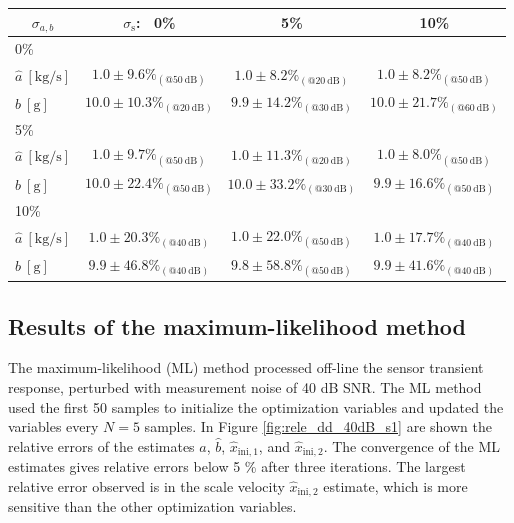 {{\begin{table}[h!]
\begin{tabular}{c| c c c} 
\hline  
$\sigma_{{a},{b}}$ & $\sigma_{\mathrm{s}}$: \ 0\% & 5\% & 10\% \\ [0.5ex] 
 \hline
 \multicolumn{1}{l|}{0\%} \\
 \multicolumn{1}{l|}{\hspace{2mm} $\widehat{a} \ \mathrm{[kg/s]}$} & $1.0 \pm 9.6 \%_{(@50 \ \mathrm{dB})}$ &  $1.0 \pm 8.2 \%_{(@20 \ \mathrm{dB})}$ & $1.0 \pm 8.2 \%_{(@50 \ \mathrm{dB})}$ \\ 
 \multicolumn{1}{l|}{\hspace{2mm} $\widehat{b} \ \mathrm{[g]}$} & $10.0 \pm 10.3 \%_{(@20 \ \mathrm{dB})}$ & $9.9 \pm 14.2 \%_{(@30 \ \mathrm{dB})}$ & $10.0 \pm 21.7 \%_{(@60 \ \mathrm{dB})}$ \\ 
 \multicolumn{1}{l|}{5\%} \\
 \multicolumn{1}{l|}{\hspace{2mm} $\widehat{a} \ \mathrm{[kg/s]}$} & $1.0 \pm 9.7 \%_{(@50 \ \mathrm{dB})}$ & $1.0 \pm 11.3 \%_{(@20 \ \mathrm{dB})}$ & $1.0 \pm 8.0 \%_{(@50 \ \mathrm{dB})}$ \\  
 \multicolumn{1}{l|}{\hspace{2mm} $\widehat{b} \ \mathrm{[g]}$} & $10.0 \pm 22.4 \%_{(@50 \ \mathrm{dB})}$ & $10.0 \pm 33.2 \%_{(@30 \ \mathrm{dB})}$ & $9.9 \pm 16.6 \%_{(@50 \ \mathrm{dB})}$ \\ 
\multicolumn{1}{l|}{10\%} \\
\multicolumn{1}{l|}{\hspace{2mm} $\widehat{a} \ \mathrm{[kg/s]}$} & $1.0 \pm 20.3 \%_{(@40 \ \mathrm{dB})}$ & $1.0 \pm 22.0 \%_{(@50 \ \mathrm{dB})}$ & $1.0 \pm 17.7 \%_{(@40 \ \mathrm{dB})}$ \\    
 \multicolumn{1}{l|}{\hspace{2mm} $\widehat{b} \ \mathrm{[g]}$} & $9.9 \pm 46.8 \%_{(@40 \ \mathrm{dB})}$ & $9.8 \pm 58.8 \%_{(@50 \ \mathrm{dB})}$ & $9.9 \pm 41.6 \%_{(@40 \ \mathrm{dB})}$ \\ [0.5ex] 
\hline
\end{tabular}
\label{table:dd_sensitivity}
\end{table}


\subsection{Results of the maximum-likelihood method}

The maximum-likelihood (ML) method processed off-line the sensor transient response, perturbed with measurement noise of 40 dB SNR.
The ML method used the first 50 samples to initialize the optimization variables and updated the variables every $N = 5$ samples.
In Figure \ref{fig:rele_dd_40dB_s1} are shown the relative errors of the estimates $\widehat{a}$, $\widehat{b}$, $\widehat{x}_{\mathrm{ini,1}}$, and $\widehat{x}_{\mathrm{ini,2}}$.
The convergence of the ML estimates gives relative errors below 5 \% after three iterations.
The largest relative error observed is in the scale velocity $\widehat{x}_{\mathrm{ini,2}}$ estimate, which is more sensitive than the other optimization variables.

}}
